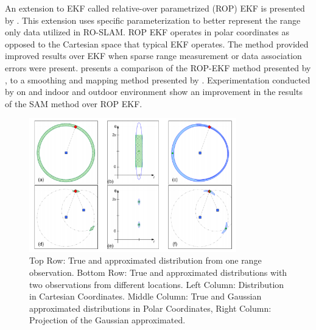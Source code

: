 \documentclass[conference]{IEEEtran}
\begin{document}
	
	
	
	
	
	
	
	
	An extension to EKF called relative-over parametrized (ROP) EKF is presented by \cite{Djugash2008}. This extension uses specific parameterization to  better represent the range only data utilized in RO-SLAM. ROP EKF operates in polar coordinates as opposed to the Cartesian space that typical EKF operates. The method provided improved results over EKF when sparse range measurement or data association errors were present. \cite{Herranz2014} presents a comparison of the ROP-EKF method presented by \cite{Djugash2008}, to a smoothing and mapping method presented by \cite{Dellaert2006}. Experimentation conducted by \cite{Herranz2014} on and indoor and outdoor environment show an improvement in the results of the SAM method over ROP EKF.
	
	\begin{figure}[h!]
		
		\centering
		
		\includegraphics[width=90mm]{ROP_djugash.png}
		
		\caption{Top Row: True and approximated distribution from one range observation. Bottom Row: True and approximated distributions with two observations from different locations. Left Column: Distribution in Cartesian Coordinates. Middle Column: True and Gaussian approximated distributions in Polar Coordinates, Right Column: Projection of the Gaussian approximated. \cite{Djugash2008}} 
		
		\label{ROP_djugash}
		
	\end{figure}
	
\end{document}
